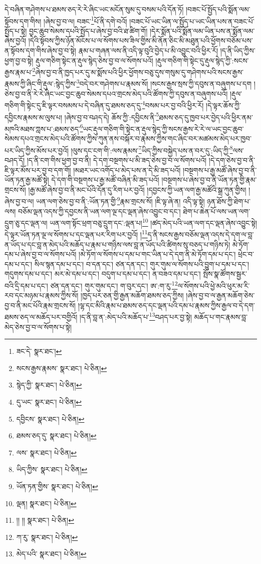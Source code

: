 དེ་བཞིན་གཤེགས་པ་ཐམས་ཅད་རེ་རེ་ཞིང་ཡང་མངོན་སུམ་དུ་བསམ་པའི་དོན་ཏོ། །བཟང་པོ་སྤྱོད་པའི་སྨོན་ལམ་སྟོབས་དག་གིས། །ཞེས་བྱ་བ་ལ། བཟང་\footnote{ཟང་དེ་  སྣར་ཐང་། }པོ་ནི་དགེ་བའོ། །བཟང་པོ་ཡང་ཡིན་ལ་སྤྱོད་པ་ཡང་ཡིན་པས་ན་བཟང་པོ་སྤྱོད་པ་སྟེ། བྱང་ཆུབ་སེམས་དཔའི་སྤྱོད་པ་ཞེས་བྱ་བའི་ཐ་ཚིག་གོ། །དེར་སྨོན་པའི་སྨོན་ལམ་ཡིན་པས་ན་སྨོན་ལམ་ཞེས་བྱའོ། །དེའི་སྟོབས་ཀྱིས་ཉོན་མོངས་པ་ལ་སོགས་པས་ཟིལ་གྱིས་མི་ནོན་ཅིང་མི་མཐུན་པའི་ཕྱོགས་བཅོམ་པས་ན་སྟོབས་དག་གིས་ཞེས་བྱ་བ་སྟེ། རྣམ་པ་གཞན་ལས་ནི་འདི་ལྟ་བུའི་བྱེད་པ་མི་འབྱུང་བའི་ཕྱིར་རོ། །ད་ནི་ཡིད་ཀྱིས་ཕྱག་བྱ་བ་སྟེ། རྡུལ་གཅིག་སྟེང་ན་རྡུལ་སྙེད་ཅེས་བྱ་བ་ལ་སོགས་པའོ། །རྡུལ་གཅིག་གི་སྟེང་དུ་རྡུལ་སྙེད་ཀྱི་:སངས་རྒྱས་རྣམ་པ་\footnote{སངས་རྒྱས་རྣམས་  སྣར་ཐང་།  པེ་ཅིན། }ཞེས་བྱ་བ་ནི་ཁྱད་པར་དུ་མ་སྨོས་པའི་ཕྱིར་ཕྱོགས་བཅུ་དུས་གསུམ་དུ་གཤེགས་པའི་སངས་རྒྱས་རྣམས་ཀྱི་ཞིང་གི་རྡུལ་:སྙེད་ཀྱིས་\footnote{སྙེད་ཀྱི་  སྣར་ཐང་།  པེ་ཅིན། }བདེ་བར་གཤེགས་པ་རྣམས་སོ། །སངས་རྒྱས་སྲས་ཀྱི་དབུས་ན་བཞུགས་པ་དག །ཅེས་བྱ་བ་ནི་རེ་རེ་ཞིང་ཡང་བྱང་ཆུབ་སེམས་དཔའ་གྲངས་མེད་པའི་ཚོགས་ཀྱི་དབུས་ན་བཞུགས་པའོ། །རྡུལ་གཅིག་གི་སྟེང་དུ་ཇི་ལྟར་བསམས་པ་དེ་བཞིན་དུ་ཐམས་ཅད་དུ་\footnote{དུ་ཡང་  སྣར་ཐང་།  པེ་ཅིན། }བསམ་པར་བྱ་བའི་ཕྱིར་རོ། །དེ་ལྟར་ཆོས་ཀྱི་དབྱིངས་རྣམས་མ་ལུས་པ། །ཞེས་བྱ་བ་བཤད་དེ། ཆོས་ཀྱི་:དབྱིངས་ནི་\footnote{དབྱིངས་  སྣར་ཐང་།  པེ་ཅིན། }ཐམས་ཅད་དུ་ཁྱབ་པར་བྱེད་པའི་ཕྱིར་ནམ་མཁའི་མཐས་ཀླས་པ་:ཐམས་ཅད་\footnote{ཐམས་ཅད་དུ་  སྣར་ཐང་།  པེ་ཅིན། }ཡང་རྡུལ་གཅིག་གི་སྟེང་ན་རྡུལ་སྙེད་ཀྱི་སངས་རྒྱས་རེ་རེ་ལ་ཡང་བྱང་ཆུབ་སེམས་དཔའ་གྲངས་མེད་པའི་ཚོགས་ཀྱིས་ཀུན་ནས་བསྐོར་བ་རྣམས་ཀྱིས་གང་ཞིང་བར་མཚམས་མེད་པར་ཁྱབ་པར་ཡིད་ཀྱིས་མོས་པར་བྱའོ། །ལུས་དང་ངག་གི་:ལས་རྣམས་\footnote{ལས་  སྣར་ཐང་།  པེ་ཅིན། }ཡིད་ཀྱིས་བསྐྱེད་པས་ན་བར་དུ་:ཡིད་ཀྱི་\footnote{ཡིད་ཀྱིས་  སྣར་ཐང་།  པེ་ཅིན། }ལས་བཤད་དོ། །ད་ནི་ངག་གིས་ཕྱག་བྱ་བ་ནི། དེ་དག་བསྔགས་པ་མི་ཟད་ཅེས་བྱ་བ་ལ་སོགས་པའོ། །དེ་དག་ཅེས་བྱ་བ་ནི་ཇི་ལྟར་མོས་པར་བྱ་བ་དག་གོ། །མཐར་ཡང་འགོད་པ་མེད་པས་ན་དེ་མི་ཟད་པའོ། །བསྔགས་པ་རྒྱ་མཚོ་ཞེས་བྱ་བ་ནི་ཡོན་ཏན་རྒྱ་མཚོ་སྟེ། དེ་དག་གི་བསྔགས་པ་རྒྱ་མཚོ་བཞིན་མི་ཟད་པའོ། །བསྔགས་པ་ཞེས་བྱ་བ་ནི་ཡོན་ཏན་གྱི་རྣམ་གྲངས་སོ། །རྒྱ་མཚོ་ཞེས་བྱ་བ་ནི་མང་པོའི་དོན་དུ་རིག་པར་བྱའོ། །དབྱངས་ཀྱི་ཡན་ལག་རྒྱ་མཚོའི་སྒྲ་ཀུན་གྱིས། །ཞེས་བྱ་བ་ལ། ཡན་ལག་ཅེས་བྱ་བ་ནི་:ཡོན་ཏན་གྱི་\footnote{ཡོན་ཏན་གྱིས་  སྣར་ཐང་།  པེ་ཅིན། }རྣམ་གྲངས་སོ། །ཇི་ལྟ་ཞེ་ན། འདི་ལྟ་སྟེ། ཉན་ཐོས་ཀྱི་ཐེག་པ་ལས། བཅོམ་ལྡན་འདས་ཀྱི་དབྱངས་ནི་ཡན་ལག་ལྔ་དང་ལྡན་ཞེས་འབྱུང་བ་དང་། ཐེག་པ་ཆེན་པོ་ལས་ཡན་ལག་དྲུག་ཅུ་དང་ལྡན་ལ། ཡན་ལག་སྟོང་ཕྲག་བཅུ་དྲུག་དང་:ལྡན་པ།\footnote{ལྡན།  སྣར་ཐང་།  པེ་ཅིན། } །ཚད་མེད་པའི་ཡན་ལག་དང་ལྡན་ཞེས་འབྱུང་སྟེ། དེ་ལྟར་ཡོན་ཏན་ལྔ་ལ་སོགས་པ་དང་ལྡན་པར་རིག་པར་བྱའོ། །\footnote{།། །།  སྣར་ཐང་།  པེ་ཅིན། }ད་ནི་སངས་རྒྱས་བཅོམ་ལྡན་འདས་དེ་དག་ལ་བླ་ན་ཡོད་པ་དང་བླ་ན་མེད་པའི་མཆོད་པ་རྣམ་པ་གཉིས་ལས་བླ་ན་ཡོད་པའི་ཚིགས་སུ་བཅད་པ་གཉིས་ཏེ། མེ་ཏོག་དམ་པ་ཞེས་བྱ་བ་ལ་སོགས་པའོ། །མེ་ཏོག་ལ་སོགས་པ་དམ་པ་གང་ཡིན་པ་དེ་དག་ནི་མེ་ཏོག་དམ་པ་དང་། ཕྲེང་བ་དམ་པ་དང་། སིལ་སྙན་དམ་པ་དང་། བ་དན་དང་། ཙན་དན་དང་། གུར་གུམ་ལ་སོགས་པའི་བྱུག་པ་དམ་པ་དང་། གདུགས་དམ་པ་དང་། མར་མེ་དམ་པ་དང་། བདུག་པ་དམ་པ་དང་། ན་བཟའ་དམ་པ་དང་། སྤོས་སྣ་ཚོགས་སྦྱར་བའི་དྲི་དམ་པ་དང་། ཙན་དན་དང་། གུར་གུམ་དང་། ག་བུར་དང་། ཨ་:ག་རུ་\footnote{ཀ་རུ་  སྣར་ཐང་།  པེ་ཅིན། }ལ་སོགས་པའི་ཕྱེ་མའི་ཕུར་མ་རི་རབ་དང་མཉམ་པ་རྣམས་ཀྱིས་སོ། །ཁྱད་པར་ཅན་གྱི་རྒྱན་མཆོག་ཐམས་ཅད་ཀྱིས། །ཞེས་བྱ་བ་ལ་རྒྱན་མཆོག་ཅེས་བྱ་བ་ནི་མང་པོའི་རྣམ་གྲངས་སོ། །ལྷ་དང་མིའི་རྣམ་པ་ཐམས་ཅད་དང་ལྡན་པའི་དམ་པ་རྣམས་ཀྱིས་རྒྱལ་བ་དེ་དག་ཐམས་ཅད་ལ་མཆོད་པར་བགྱིའོ། །ད་ནི་བླ་ན་:མེད་པའི་མཆོད་པ་\footnote{མེད་པའི་  སྣར་ཐང་།  པེ་ཅིན། }བཤད་པར་བྱ་སྟེ། མཆོད་པ་གང་རྣམས་བླ་མེད་ཅེས་བྱ་བ་ལ་སོགས་པ་སྟེ། 